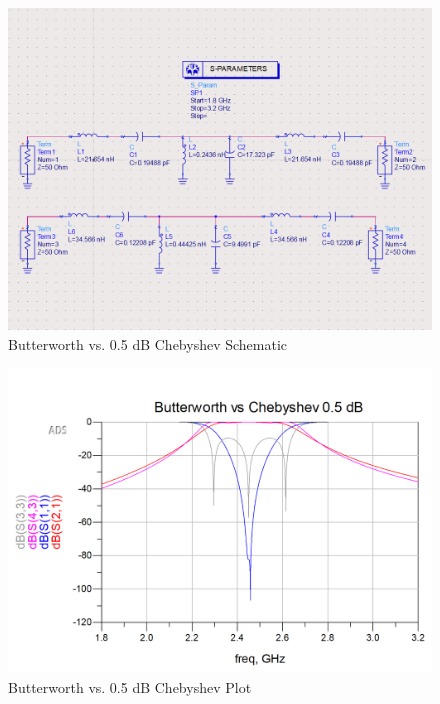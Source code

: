 \documentclass{article}
\begin{document}
\begin{figure}[h!]
    \centering
    \includegraphics[scale=0.4]{images/butterworth_vs_chebyshev0pt5_schematic.png}
    \caption{Butterworth vs. 0.5 dB Chebyshev Schematic}
    \label{fig:18}
\end{figure}
\begin{figure}[h!]
    \centering
    \includegraphics[scale=0.3]{images/butterworth_vs_chebyshev0pt5_plot.png}
    \caption{Butterworth vs. 0.5 dB Chebyshev Plot}
    \label{fig:19}
\end{figure}
\end{document}
